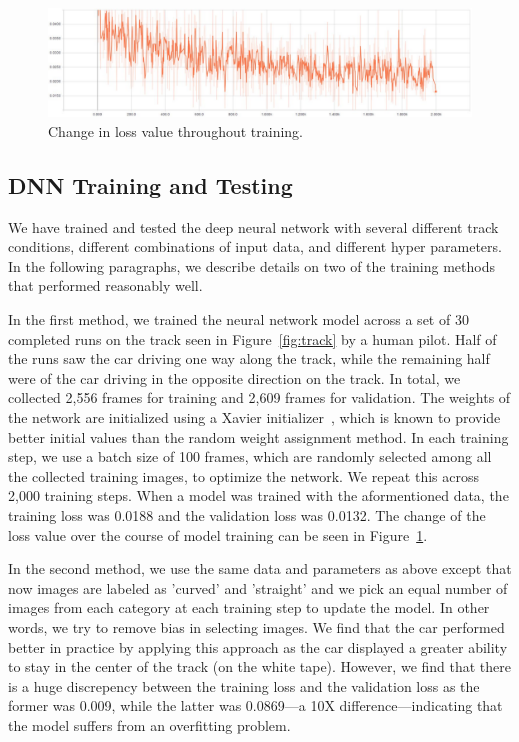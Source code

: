 \begin{figure}[h]
  \centering
  \includegraphics[width=.9\textwidth]{figs/TrainingLoss}
  \caption{Change in loss value throughout training.}
  \label{fig:modelloss}
\end{figure}


\subsection{DNN Training and Testing}
We have trained and tested the deep neural network with several
different track conditions, different combinations of input
data, and different hyper parameters. In the following paragraphs, we 
describe details on two of the training methods that performed 
reasonably well.

In the first method, we trained the neural network model across a set 
of 30 completed runs on the track seen in Figure~\ref{fig:track} by a
human pilot. Half of the runs saw the car driving one way along the
track, while the remaining half were of the car driving in the
opposite direction on the track.
In total, we collected 2,556 frames for training and 2,609 
frames for validation.
The weights of the network are initialized using a Xavier
initializer~\cite{Glorot2010}, which is known to provide better
initial values than the random weight assignment method.
In each training step, we use a batch
size of 100 frames, which are randomly selected among all the
collected training images, to optimize the network.
We repeat this across 2,000 training steps. When a model was trained
with the  aformentioned data, the training loss was 0.0188 and the
validation  loss was 0.0132.
The change of the loss value over the course of model training can be
seen in Figure~\ref{fig:modelloss}.

In the second method, we use the same data and parameters as  above 
except that now images are labeled as 'curved' and 'straight' and we pick an
equal number of images from each category at each training step to
update the model. In other words, we try to remove bias in selecting
images. We find that the car performed better in practice by applying
this approach as the car displayed a greater ability to stay in the
center of the track (on the white tape).
However, we find that there is a huge discrepency between the training
loss and the validation loss as the former was 0.009, while the latter
was 0.0869---a 10X difference---indicating that the model suffers from
an overfitting problem.

